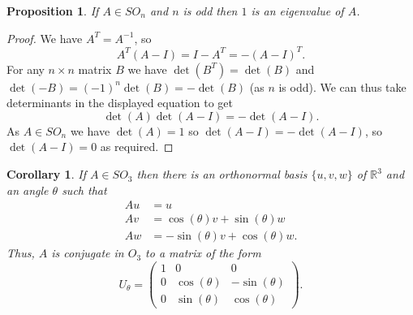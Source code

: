 \documentclass{amsart}
\newcommand{\R}         {{\mathbb{R}}}
\newcommand{\tm}        {\times}
\renewcommand{\:}{\colon}
\newtheorem{proposition}[theorem]{Proposition}
\newtheorem{corollary}[theorem]{Corollary}
\theoremstyle{definition}
\begin{document}
\begin{proposition}
 If $A\in SO_n$ and $n$ is odd then $1$ is an eigenvalue of $A$.
\end{proposition}
\begin{proof}
 We have $A^T=A^{-1}$, so
 \[ A^T(A-I) = I-A^T = -(A-I)^T. \]
 For any $n\tm n$ matrix $B$ we have $\det(B^T)=\det(B)$ and
 $\det(-B)=(-1)^n\det(B)=-\det(B)$ (as $n$ is odd).  We can thus take
 determinants in the displayed equation to get
 \[ \det(A)\det(A-I)=-\det(A-I). \]
 As $A\in SO_n$ we have $\det(A)=1$ so $\det(A-I)=-\det(A-I)$, so
 $\det(A-I)=0$ as required.
\end{proof}

\begin{corollary}\label{cor-gauss}
 If $A\in SO_3$ then there is an orthonormal basis $\{u,v,w\}$ of
 $\R^3$ and an angle $\theta$ such that
 \begin{align*}
  Au &= u \\
  Av &=  \cos(\theta)v + \sin(\theta)w \\
  Aw &= -\sin(\theta)v + \cos(\theta)w.
 \end{align*}
 Thus, $A$ is conjugate in $O_3$ to a matrix of the form
 \[ U_\theta = \left(\begin{array}{ccc}
     1 & 0 & 0 \\
     0 & \cos(\theta) & -\sin(\theta) \\
     0 & \sin(\theta) & \cos(\theta)
 \end{array} \right). \]
\end{corollary}
\end{document}
